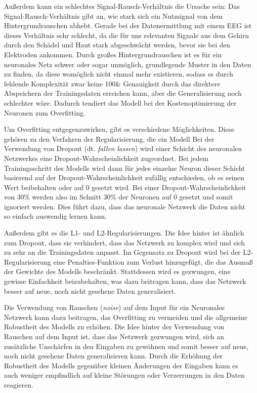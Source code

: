 \documentclass[10pt]{article}
\newcommand{\eng}[1]{\textit{#1}}
\newcommand{\feng}[1]{{#1}}
\begin{document}
Außerdem kann ein schlechtes Signal-Rausch-Verhältnis die Ursache sein: Das Signal-Rausch-Verhältnis gibt an, wie stark sich ein Nutzsignal von dem Hintergrundrauschen abhebt. 
Gerade bei der Datenermittlung mit einem EEG ist dieses Verhältnis sehr schlecht, da die für uns relevanten Signale aus dem Gehirn durch den Schädel und Haut stark abgeschwächt werden, bevor sie bei den Elektroden ankommen. 
Durch großes Hintergrundrauschen ist es für ein neuronales Netz schwer oder sogar unmöglich, grundlegende Muster in den Daten zu finden, da diese womöglich nicht einmal mehr existieren, sodass es durch fehlende Komplexität zwar keine 100\& Genauigkeit durch das direktere Abspeichern der Trainingsdaten erreichen kann, aber die Generalisierung noch schlechter wäre. 
Dadurch tendiert das Modell bei der Kostenoptimierung der Neuronen zum Overfitting.

Um Overfitting entgegenzuwirken, gibt es verschiedene Möglichkeiten. Diese gehören zu den Verfahren der Regularisierung, die ein Modell 
Bei der Verwendung von Dropout (dt. \textit{fallen lassen}) wird einer Schicht des neuronalen Netzwerkes eine Dropout-Wahrscheinlichkeit zugeordnet.
Bei jedem Trainingsschritt des Modells wird dann für jedes einzelne Neuron dieser Schicht basierend auf der Dropout-Wahrscheinlichkeit zufällig entschieden, ob es seinen Wert beibehalten oder auf 0 gesetzt wird. 
Bei einer Dropout-Wahrscheinlichkeit von 30\% werden also im Schnitt 30\% der Neuronen auf 0 gesetzt und somit ignoriert werden.  %
Dies führt dazu, dass das neuronale Netzwerk die Daten nicht so einfach auswendig lernen kann. %

Außerdem gibt es die L1- und L2-Regularisierungen.  
Die Idee hinter ist ähnlich zum Dropout, dass sie verhindert, dass das Netzwerk zu komplex wird und sich zu sehr an die Trainingsdaten anpasst.
Im Gegensatz zu \feng{Dropout} wird bei der L2-Regularisierung eine Penalties-Funktion zum Verlust hinzugefügt, die das Ausmaß der Gewichte des Modells beschränkt. Stattdessen wird es gezwungen, eine gewisse Einfachheit beizubehalten, was dazu beitragen kann, dass das Netzwerk besser auf neue, noch nicht gesehene Daten generalisiert.

Die Verwendung von Rauschen (\eng{noise}) auf dem Input für ein Neuronales Netzwerk kann dazu beitragen, das Overfitting zu vermeiden und die allgemeine Robustheit des Modells zu erhöhen.
Die Idee hinter der Verwendung von Rauschen auf dem Input ist, dass das Netzwerk gezwungen wird, sich an zusätzliche Unschärfen in den Eingaben zu gewöhnen und somit besser auf neue, noch nicht gesehene Daten generalisieren kann. Durch die Erhöhung der Robustheit des Modells gegenüber kleinen Änderungen der Eingaben kann es auch weniger empfindlich auf kleine Störungen oder Verzerrungen in den Daten reagieren.
\end{document}
